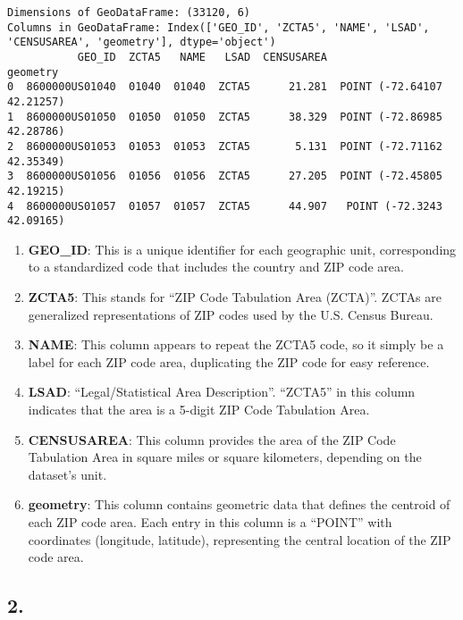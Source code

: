 \documentclass[
  letterpaper,
  DIV=11,
  numbers=noendperiod]{scrartcl}
\begin{document}
\begin{verbatim}
Dimensions of GeoDataFrame: (33120, 6)
Columns in GeoDataFrame: Index(['GEO_ID', 'ZCTA5', 'NAME', 'LSAD', 'CENSUSAREA', 'geometry'], dtype='object')
           GEO_ID  ZCTA5   NAME   LSAD  CENSUSAREA                    geometry
0  8600000US01040  01040  01040  ZCTA5      21.281  POINT (-72.64107 42.21257)
1  8600000US01050  01050  01050  ZCTA5      38.329  POINT (-72.86985 42.28786)
2  8600000US01053  01053  01053  ZCTA5       5.131  POINT (-72.71162 42.35349)
3  8600000US01056  01056  01056  ZCTA5      27.205  POINT (-72.45805 42.19215)
4  8600000US01057  01057  01057  ZCTA5      44.907   POINT (-72.3243 42.09165)
\end{verbatim}

\begin{enumerate}
\def\labelenumi{\arabic{enumi}.}
\item
  \textbf{GEO\_ID}: This is a unique identifier for each geographic
  unit, corresponding to a standardized code that includes the country
  and ZIP code area.
\item
  \textbf{ZCTA5}: This stands for ``ZIP Code Tabulation Area (ZCTA)''.
  ZCTAs are generalized representations of ZIP codes used by the U.S.
  Census Bureau.
\item
  \textbf{NAME}: This column appears to repeat the ZCTA5 code, so it
  simply be a label for each ZIP code area, duplicating the ZIP code for
  easy reference.
\item
  \textbf{LSAD}: ``Legal/Statistical Area Description''. ``ZCTA5'' in
  this column indicates that the area is a 5-digit ZIP Code Tabulation
  Area.
\item
  \textbf{CENSUSAREA}: This column provides the area of the ZIP Code
  Tabulation Area in square miles or square kilometers, depending on the
  dataset's unit.
\item
  \textbf{geometry}: This column contains geometric data that defines
  the centroid of each ZIP code area. Each entry in this column is a
  ``POINT'' with coordinates (longitude, latitude), representing the
  central location of the ZIP code area.
\end{enumerate}

\subsection{2.}\label{section-4}
\end{document}
